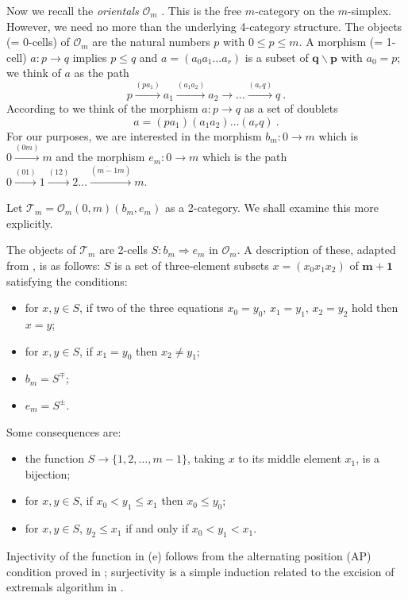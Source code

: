 \documentclass[a4paper,12pt,reqno]{amsart}
\theoremstyle{definition}
\theoremstyle{fact}
\theoremstyle{genquest}
\theoremstyle{step}
\newcommand{\lra}{\longrightarrow}
\newcommand{\Lra}{\Longrightarrow}
\def\CO{{\mathscr O}}
\def\CT{{\mathscr T}}
\begin{document}
Now we recall the {\em orientals} $\CO_m$ \cite{aos}. This is the free $m$-category on the $m$-simplex.
However, we need no more than the underlying 4-category structure. 
The objects (= 0-cells) of $\CO_m$ are the natural numbers $p$ with $0 \le p \le m$. 
A morphism (= 1-cell) $a : p \lra q$ implies $p\le q$ and $a=(a_0 a_1\dots a_r)$ is a subset of $\mathbf{q}\smallsetminus \mathbf{p}$
with $a_0 =p$; we think of $a$ as the path 
$$p\stackrel{(pa_1)}\lra a_1\stackrel{(a_1a_2)}\lra a_2\lra \dots \stackrel{(a_rq)}\lra q \ .$$
According to \cite{aos} we think of the morphism $a : p \lra q$ as a set of doublets 
$$a=(pa_1)(a_1a_2)\dots (a_rq) \ .$$  
For our purposes, we are interested in the morphism $b_m : 0 \lra m$ which is $0\stackrel{(0m)}\lra m$ and
the morphism $e_m : 0 \lra m$ which is the path $0\stackrel{(01)}\lra 1 \stackrel{(12)}\lra 2 \dots  \stackrel{(\overline{m-1}m)}\lra m$. 

Let $\CT_m = \CO_m (0,m)(b_m,e_m)$ as a 2-category. We shall examine this more explicitly. 

The objects of $\CT_m$ are 2-cells $S:b_m \Lra e_m$ in $\CO_m$.
A description of these, adapted from \cite{aos}, is as follows: 
$S$ is a set of three-element subsets $x=(x_0x_1x_2)$ of $\mathbf{m+1}$ 
satisfying the conditions:
\begin{itemize}
\item[(a)] for $x,y\in S$, if two of the three equations $x_0=y_0$, $x_1=y_1$, $x_2=y_2$ hold then $x=y$;
\item[(b)] for $x,y\in S$, if $x_1=y_0$ then $x_2\neq y_1$;
\item[(c)] $b_m = S^{\mp}$;
\item[(d)] $e_m = S^{\pm}$.
\end{itemize} 
Some consequences are:
\begin{itemize}
\item[(e)] the function $S\lra \{1,2,\dots ,m-1\}$, taking $x$ to its middle element $x_1$, is a bijection;
\item[(f)] for $x,y\in S$, if $x_0<y_1\le x_1$ then $x_0\le y_0$;
\item[(g)] for $x,y\in S$, $y_2\le x_1$ if and only if $x_0< y_1<x_1$.
\end{itemize} 
Injectivity of the function in (e) follows from the alternating position (AP) condition proved in \cite{aos}; surjectivity is a simple induction related to the excision of extremals
algorithm in \cite{aos}. 
\end{document}
